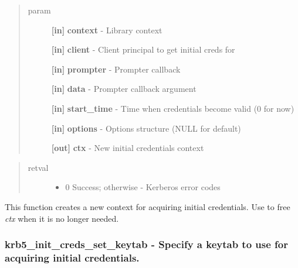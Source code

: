 \documentclass[letterpaper,10pt,english]{sphinxmanual}
\begin{document}
\begin{quote}\begin{description}
\item[{param}] \leavevmode
\textbf{{[}in{]}} \textbf{context} - Library context

\textbf{{[}in{]}} \textbf{client} - Client principal to get initial creds for

\textbf{{[}in{]}} \textbf{prompter} - Prompter callback

\textbf{{[}in{]}} \textbf{data} - Prompter callback argument

\textbf{{[}in{]}} \textbf{start\_time} - Time when credentials become valid (0 for now)

\textbf{{[}in{]}} \textbf{options} - Options structure (NULL for default)

\textbf{{[}out{]}} \textbf{ctx} - New initial credentials context

\end{description}\end{quote}
\begin{quote}\begin{description}
\item[{retval}] \leavevmode\begin{itemize}
\item {} 
0   Success; otherwise - Kerberos error codes

\end{itemize}

\end{description}\end{quote}

This function creates a new context for acquiring initial credentials. Use {\hyperref[appdev/refs/api/krb5_init_creds_free:krb5_init_creds_free]{}} to free \emph{ctx} when it is no longer needed.


\subsubsection{krb5\_init\_creds\_set\_keytab -  Specify a keytab to use for acquiring initial credentials.}
\label{appdev/refs/api/krb5_init_creds_set_keytab:krb5-init-creds-set-keytab-specify-a-keytab-to-use-for-acquiring-initial-credentials}\label{appdev/refs/api/krb5_init_creds_set_keytab::doc}

\begin{fulllineitems}
\label{appdev/refs/api/krb5_init_creds_set_keytab:krb5_init_creds_set_keytab}
\end{fulllineitems}
\end{document}
